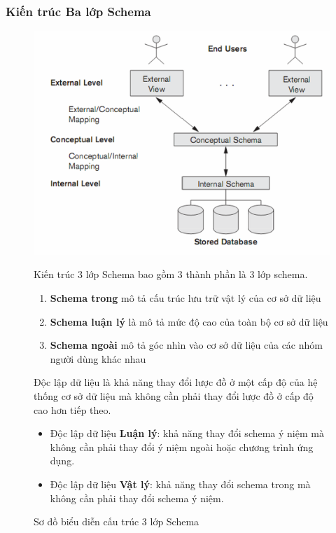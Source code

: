 \subsubsection{Kiến trúc Ba lớp Schema}
\begin{figure}[H]
	\centering
	\includegraphics[width=\textwidth]{Images/ThreeSchema.png}
	\vspace{0.25cm}
	\caption{Sơ đồ biểu diễn cấu trúc 3 lớp Schema}
	\hspace*{0.5cm} Kiến trúc 3 lớp Schema bao gồm 3 thành phần là 3 lớp schema.
	\begin{enumerate}
		\item \textbf{Schema trong} mô tả cấu trúc lưu trữ vật lý của cơ sở dữ liệu
		\item \textbf{Schema luận lý} là mô tả mức độ cao của toàn bộ cơ sở dữ liệu
		\item \textbf{Schema ngoài} mô tả góc nhìn vào cơ sở dữ liệu của các nhóm người dùng khác nhau 
	\end{enumerate}
	\hspace*{0.5cm} Độc lập dữ liệu là khả năng thay đổi lược đồ ở một cấp độ của hệ thống cơ sở dữ liệu mà không cần phải thay đổi lược đồ ở cấp độ cao hơn tiếp theo.
	\begin{itemize}
		\item Độc lập dữ liệu \textbf{Luận lý}: khả năng thay đổi schema ý niệm mà không cần phải thay đổi ý niệm ngoài hoặc chương trình ứng dụng.
		\item Độc lập dữ liệu \textbf{Vật lý}: khả năng thay đổi schema trong mà không cần phải thay đổi schema ý niệm.
	\end{itemize}
\end{figure}
